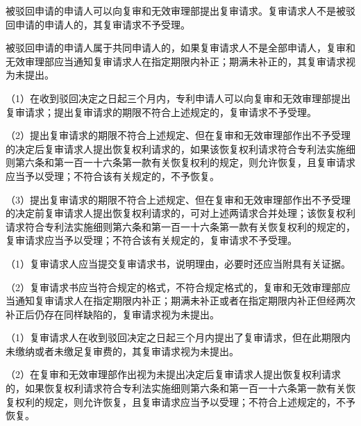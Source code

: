 被驳回申请的申请人可以向复审和无效审理部提出复审请求。复审请求人不是被驳回申请的申请人的，其复审请求不予受理。

被驳回申请的申请人属于共同申请人的，如果复审请求人不是全部申请人，复审和无效审理部应当通知复审请求人在指定期限内补正；期满未补正的，其复审请求视为未提出。

{\setlength{\parindent}{17.1bp}（1）在收到驳回决定之日起三个月内，专利申请人可以向复审和无效审理部提出复审请求；提出复审请求的期限不符合上述规定的，复审请求不予受理。\par}

{\setlength{\parindent}{17.1bp}（2）提出复审请求的期限不符合上述规定、但在复审和无效审理部作出不予受理的决定后复审请求人提出恢复权利请求的，如果该恢复权利请求符合专利法实施细则第六条和第一百一十六条第一款有关恢复权利的规定，则允许恢复，且复审请求应当予以受理；不符合该有关规定的，不予恢复。\par}

{\setlength{\parindent}{17.1bp}（3）提出复审请求的期限不符合上述规定、但在复审和无效审理部作出不予受理的决定前复审请求人提出恢复权利请求的，可对上述两请求合并处理；该恢复权利请求符合专利法实施细则第六条和第一百一十六条第一款有关恢复权利的规定的，复审请求应当予以受理；不符合该有关规定的，复审请求不予受理。\par}

{\setlength{\parindent}{17.1bp}（1）复审请求人应当提交复审请求书，说明理由，必要时还应当附具有关证据。\par}

{\setlength{\parindent}{17.1bp}（2）复审请求书应当符合规定的格式，不符合规定格式的，复审和无效审理部应当通知复审请求人在指定期限内补正；期满未补正或者在指定期限内补正但经两次补正后仍存在同样缺陷的，复审请求视为未提出。\par}

{\setlength{\parindent}{17.1bp}（1）复审请求人在收到驳回决定之日起三个月内提出了复审请求，但在此期限内未缴纳或者未缴足复审费的，其复审请求视为未提出。\par}

{\setlength{\parindent}{17.1bp}（2）在复审和无效审理部作出视为未提出决定后复审请求人提出恢复权利请求的，如果恢复权利请求符合专利法实施细则第六条和第一百一十六条第一款有关恢复权利的规定，则允许恢复，且复审请求应当予以受理；不符合上述规定的，不予恢复。\par}

